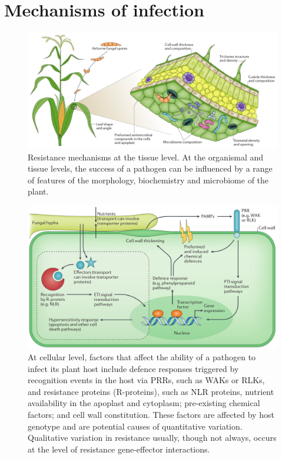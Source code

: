 \documentclass[11pt,dvipsnames,ignorenonframetext,aspectratio=169]{beamer}
\begin{document}
\hypertarget{mechanisms-of-infection}{%
\section{Mechanisms of infection}\label{mechanisms-of-infection}}

\begin{frame}{}
\protect\hypertarget{section-1}{}
\begin{figure}
\includegraphics[width=0.8\linewidth]{../images/infection_process_plants_extracellular} \caption{Resistance mechanisms at the tissue level. At the organismal and tissue levels, the success of a pathogen can be influenced by a range of features of the morphology, biochemistry and microbiome of the plant.}\label{fig:infection-mechanism-extracellular}
\end{figure}
\end{frame}

\begin{frame}{}
\protect\hypertarget{section-2}{}
\begin{figure}
\includegraphics[width=0.8\linewidth]{../images/infection_process_plants_intracellular} \caption{At cellular level, factors that affect the ability of a pathogen to infect its plant host include defence responses triggered by recognition events in the host via PRRs, such as WAKs or RLKs, and resistance proteins (R-proteins), such as NLR proteins, nutrient availability in the apoplast and cytoplasm; pre-existing chemical factors; and cell wall constitution. These factors are affected by host genotype and are potential causes of quantitative variation. Qualitative variation in resistance usually, though not always, occurs at the level of resistance gene-effector interactions.}\label{fig:infection-mechanism-intracellular}
\end{figure}
\end{frame}
\end{document}
